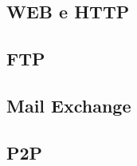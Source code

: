 \documentclass[12pt]{article}
\begin{document}
\subsection{WEB e HTTP}

\subsection{FTP}

\subsection{Mail Exchange}

\subsection{P2P}








\end{document}
